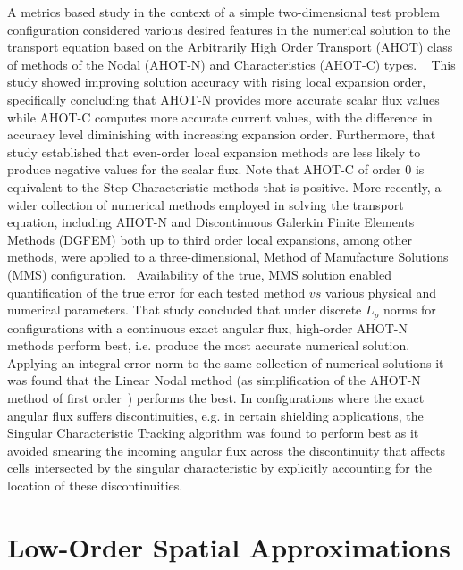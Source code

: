 A metrics based study in the context of a simple two-dimensional test problem configuration considered various desired features in the numerical solution to the transport equation based on the Arbitrarily High Order Transport (AHOT) class of methods of the Nodal (AHOT-N) and Characteristics (AHOT-C) types. ~\cite{Azmy1992} This study showed improving solution accuracy with rising local expansion order, specifically concluding that AHOT-N provides more accurate scalar flux values while AHOT-C computes more accurate current values, with the difference in accuracy level diminishing with increasing expansion order. Furthermore, that study established that even-order local expansion methods are less likely to produce negative values for the scalar flux. Note that AHOT-C of order 0 is equivalent to the Step Characteristic methods that is positive. More recently, a wider collection of numerical methods employed in solving the transport equation, including AHOT-N and Discontinuous Galerkin Finite Elements Methods (DGFEM) both up to third order local expansions, among other methods, were applied to a three-dimensional, Method of Manufacture Solutions (MMS) configuration.~\cite{Schunert2015} Availability of the true, MMS solution enabled quantification of the true error for each tested method $vs$ various physical and numerical parameters. That study concluded that under discrete $L_p$ norms for configurations with a continuous exact angular flux, high-order AHOT-N methods perform best, i.e. produce the most accurate numerical solution. Applying an integral error norm to the same collection of numerical solutions it was found that the Linear Nodal method (as simplification of the AHOT-N method of first order~\cite{Azmy1988}) performs the best. In configurations where the exact angular flux suffers discontinuities, e.g. in certain shielding applications, the Singular Characteristic Tracking algorithm was found to perform best as it avoided smearing the incoming angular flux across the discontinuity that affects cells intersected by the singular characteristic by explicitly accounting for the location of these discontinuities.~\cite{Duo2009}

\section{Low-Order Spatial Approximations}

